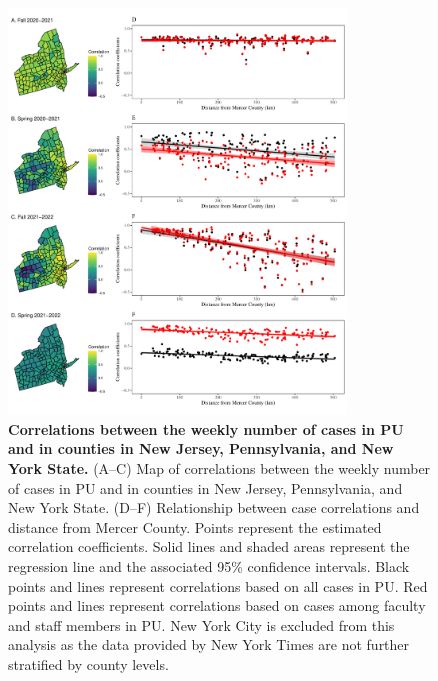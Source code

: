\documentclass[12pt]{article}
\begin{document}
\begin{figure}[!htp]
\includegraphics[width=0.8\textwidth]{../figure_princeton_new/figure_princeton_map_extended.pdf}
\caption{
\textbf{Correlations between the weekly number of cases in PU and in counties in New Jersey, Pennsylvania, and New York State.}
(A--C) Map of correlations between the weekly number of cases in PU and in counties in New Jersey, Pennsylvania, and New York State.
(D--F) Relationship between case correlations and distance from Mercer County.
Points represent the estimated correlation coefficients.
Solid lines and shaded areas represent the regression line and the associated 95\% confidence intervals.
Black points and lines represent correlations based on all cases in PU.
Red points and lines represent correlations based on cases among faculty and staff members in PU.
New York City is excluded from this analysis as the data provided by New York Times are not further stratified by county levels.
}
\end{figure}

\pagebreak
\end{document}
